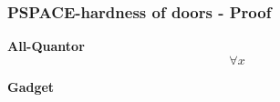 \documentclass{beamer}
\begin{document}
\begin{frame}
  \frametitle{PSPACE-hardness of doors - Proof}
  \begin{minipage}[t]{0.45\textwidth}
    \textbf{All-Quantor}
    \[ \forall x \]
  \end{minipage}
  \begin{minipage}[t]{0.45\textwidth}
    \textbf{Gadget}

\end{minipage}
\end{frame}
\end{document}
